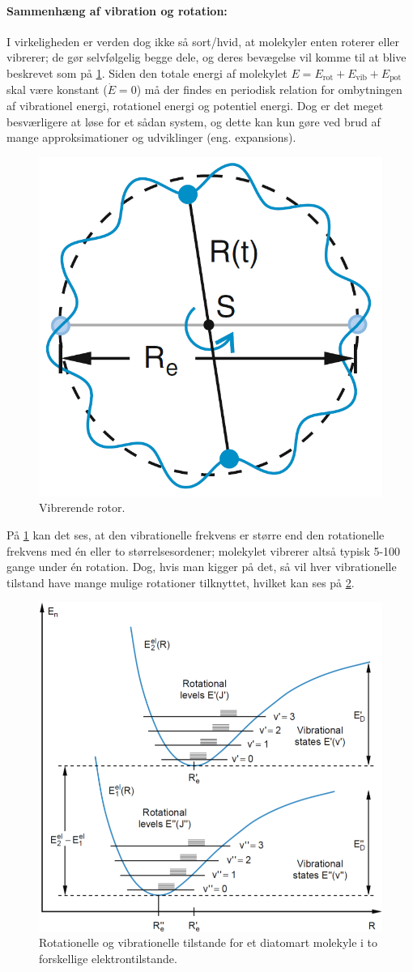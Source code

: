 \paragraph{Sammenhæng af vibration og rotation:} I virkeligheden er verden dog ikke så sort/hvid, at molekyler enten roterer eller vibrerer; de gør selvfølgelig begge dele, og deres bevægelse vil komme til at blive beskrevet som på \cref{fig:Q20_VibratingRotor}. Siden den totale energi af molekylet $E = E_\text{rot} + E_\text{vib} + E_\text{pot}$ skal være konstant ($\Dot{E} = 0$) må der findes en periodisk relation for ombytningen af vibrationel energi, rotationel energi og potentiel energi. Dog er det meget besværligere at løse for et sådan system, og dette kan kun gøre ved brud af mange approksimationer og udviklinger (eng. expansions).

\begin{figure}[!h]
    \centering
    \includegraphics[width=.35\textwidth]{Q20/images/VibratingRotor.PNG}
    \caption{Vibrerende rotor.}
    \label{fig:Q20_VibratingRotor}
\end{figure}

På \cref{fig:Q20_VibratingRotor} kan det ses, at den vibrationelle frekvens er større end den rotationelle frekvens med én eller to størrelsesordener; molekylet vibrerer altså typisk 5-100 gange under én rotation. Dog, hvis man kigger på det, så vil hver vibrationelle tilstand have mange mulige rotationer tilknyttet, hvilket kan ses på \cref{fig:Q20_VibrationOgRotationPotential}.

\begin{figure}[!h]
    \centering
    \includegraphics[width=.8\textwidth]{Q20/images/VibrationOgRotationIPotentialDiatomartMolekyle.PNG}
    \caption{Rotationelle og vibrationelle tilstande for et diatomart molekyle i to forskellige elektrontilstande.}
    \label{fig:Q20_VibrationOgRotationPotential}
\end{figure}